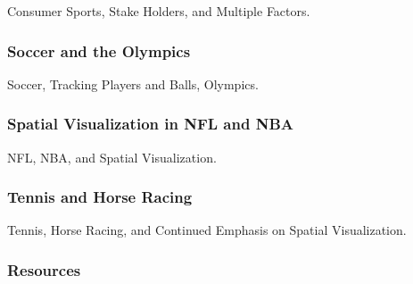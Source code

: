 Consumer Sports, Stake Holders, and Multiple Factors.




\subsubsection{Soccer and the Olympics}\label{soccer-and-the-olympics}

Soccer, Tracking Players and Balls, Olympics.





\subsubsection{Spatial Visualization in NFL and
NBA}\label{spatial-visualization-in-nfl-and-nba}

NFL, NBA, and Spatial Visualization.





\subsubsection{Tennis and Horse Racing}\label{tennis-and-horse-racing}

Tennis, Horse Racing, and Continued Emphasis on Spatial Visualization.




\subsubsection{Resources}\label{resources-2}

